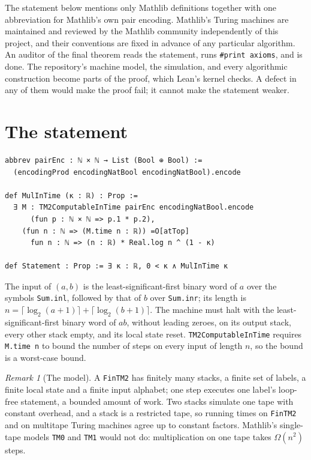 \documentclass[11pt]{amsart}
\theoremstyle{remark}
\newtheorem{remark}[theorem]{Remark}
\begin{document}
The statement below mentions only Mathlib definitions together with one abbreviation for
Mathlib's own pair encoding. Mathlib's Turing machines are maintained and reviewed by the
Mathlib community independently of this project, and their conventions are fixed in advance of
any particular algorithm. An auditor of the final theorem reads the statement, runs
\verb|#print axioms|, and is done. The repository's machine model, the simulation, and every
algorithmic construction become parts of the proof, which Lean's kernel checks. A defect in any
of them would make the proof fail; it cannot make the statement weaker.

\section{The statement}

\begin{lstlisting}
abbrev pairEnc : ℕ × ℕ → List (Bool ⊕ Bool) :=
  (encodingProd encodingNatBool encodingNatBool).encode

def MulInTime (κ : ℝ) : Prop :=
  ∃ M : TM2ComputableInTime pairEnc encodingNatBool.encode
      (fun p : ℕ × ℕ => p.1 * p.2),
    (fun n : ℕ => (M.time n : ℝ)) =O[atTop]
      fun n : ℕ => (n : ℝ) * Real.log n ^ (1 - κ)

def Statement : Prop := ∃ κ : ℝ, 0 < κ ∧ MulInTime κ
\end{lstlisting}

The input of $(a,b)$ is the least-significant-first binary word of $a$ over the symbols
\texttt{Sum.inl}, followed by that of $b$ over \texttt{Sum.inr}; its length is
$n=\lceil\log_2(a+1)\rceil+\lceil\log_2(b+1)\rceil$. The machine must halt with the
least-significant-first binary word of $ab$, without leading zeroes, on its output stack, every
other stack empty, and its local state reset. \texttt{TM2ComputableInTime} requires
\texttt{M.time n} to bound the number of steps on every input of length $n$, so the bound is a
worst-case bound.

\begin{remark}[The model]
A \texttt{FinTM2} has finitely many stacks, a finite set of labels, a finite local state and a
finite input alphabet; one step executes one label's loop-free statement, a bounded amount of
work. Two stacks simulate one tape with constant overhead, and a stack is a restricted tape, so
running times on \texttt{FinTM2} and on multitape Turing machines agree up to constant factors.
Mathlib's single-tape models \texttt{TM0} and \texttt{TM1} would not do: multiplication on one
tape takes $\Omega(n^2)$ steps.
\end{remark}
\end{document}
